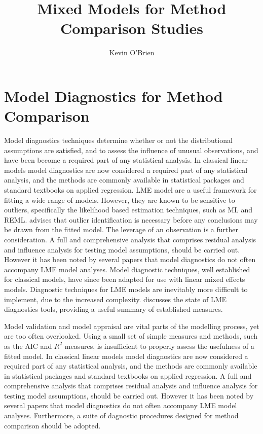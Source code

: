 \documentclass[12pt, a4paper]{report}
\author{ } \date{ }
\theoremstyle{definition}
\theoremstyle{remark}
\begin{document}
\author{Kevin O'Brien}
\title{Mixed Models for Method Comparison Studies}
\tableofcontents



\newpage
\chapter{Model Diagnostics for Method Comparison}

Model diagnostics techniques determine whether or not the distributional assumptions are satisfied, and to assess the influence of unusual observations, and have been become a required part of any statistical analysis. In classical linear models model diagnostics are now considered a required part of any statistical analysis, and the methods are commonly available in statistical packages and standard textbooks on applied regression. LME model are a useful framework for fitting a wide range of models. However, they are known to be sensitive to outliers, specifically the likelihood based estimation techniques, such as ML and REML. \citet{Christensen} advises that outlier identification is necessary before any conclusions may be drawn from the fitted model. The leverage of an observation is a further consideration. 
A full and comprehensive analysis that comprises residual analysis and influence analysis for testing model assumptions, should be carried out. However it has been noted by several papers \citep{Christensen, schabenberger} that model diagnostics do not often accompany LME model analyses. Model diagnostic techniques, well established for classical models, have since been adapted for use with linear mixed effects models. Diagnostic techniques for LME models are inevitably more difficult to implement, due to the increased complexity. \citet{schabenberger} discusses the state of LME diagnostics tools, providing a useful summary of established measures.


Model validation and model appraisal are vital parts of the modelling process, yet are too often overlooked. Using a small set of simple measures and methods, such as the AIC and $R^2$ measures, is insufficient to properly assess the usefulness of a fitted model. In classical linear models model diagnostics are now considered a required part of any statistical analysis, and the methods are commonly available in statistical packages and standard textbooks on applied regression. A full and comprehensive
analysis that comprises residual analysis and influence analysis for testing model assumptions, should be carried out. However it has been noted by several papers \citep{Christensen, schabenberger} that model diagnostics do not often accompany LME model analyses. Furthermore, a suite of dagnostic procedures designed for method comparison should be adopted.
\end{document}
